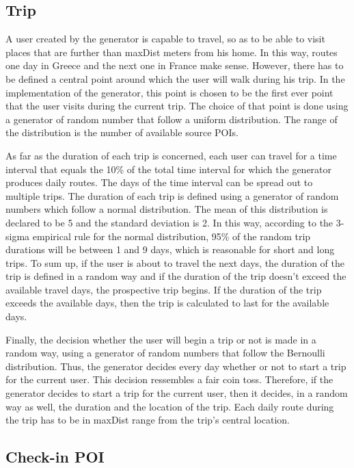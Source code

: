 \subsection{Trip}

A user created by the generator is capable to travel, so as to be able to visit places that are further than maxDist meters from his home. In this way, 
routes one day in Greece and the next one in France make sense. However, there has to be defined a central point around which the user will walk during his trip. 
In the implementation of the generator, this point is chosen to be the first ever point that the user visits during the current trip. 
The choice of that point is done using a generator of random number that follow a uniform distribution. The range of the distribution is the number 
of available source POIs.

As far as the duration of each trip is concerned, each user can travel for a time interval that equals the 10\% of the total time interval for which the generator 
produces daily routes. The days of the time interval can be spread out to multiple trips. The duration of each trip is defined using a generator of random numbers 
which follow a normal distribution. The mean of this distribution is declared to be 5 and the standard deviation is 2. In this way, according to the 
3-sigma empirical rule for the normal distribution, 95\% of the random trip durations will be between 1 and 9 days, which is reasonable for short and long trips. 
To sum up, if the user is about to travel the next days, the duration of the trip is defined in a random way and if the duration of the trip doesn't exceed the 
available travel days, the prospective trip begins. If the duration of the trip exceeds the available days, then the trip is calculated to last for the 
available days.

Finally, the decision whether the user will begin a trip or not is made in a random way, using a generator of random numbers that follow the Bernoulli distribution. 
Thus, the generator decides every day whether or not to start a trip for the current user. This decision ressembles a fair coin toss. Therefore, 
if the generator decides to start a trip for the current user, then it decides, in a random way as well, the duration and the location of the trip. Each 
daily route during the trip has to be in maxDist range from the trip's central location.

\subsection{Check-in POI}

